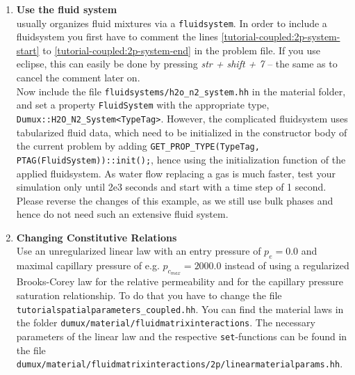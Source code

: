 \begin{enumerate}
\item \textbf{Use the \Dumux fluid system} \\
\Dumux usually organizes fluid mixtures via a \texttt{fluidsystem}. In order to include a fluidsystem you first have to comment the lines \ref{tutorial-coupled:2p-system-start} to \ref{tutorial-coupled:2p-system-end} in the problem file. If you use eclipse, this can easily be done by pressing \textit{str + shift + 7} -- the same as to cancel the comment later on.\\
Now include the file \texttt{fluidsystems/h2o\_n2\_system.hh} in the material folder, and set a property \texttt{FluidSystem} with the appropriate type, \texttt{Dumux::H2O\_N2\_System<TypeTag>}. However, the complicated fluidsystem uses tabularized fluid data, which need to be initialized in the constructor body of the current problem by adding \texttt{GET\_PROP\_TYPE(TypeTag, PTAG(FluidSystem))::init();}, hence using the initialization function of the applied fluidsystem. As water flow replacing a gas is much faster, test your simulation only until 2e3 seconds and start with a time step of 1 second.\\
Please reverse the changes of this example, as we still use bulk phases and hence do not need such an extensive fluid system.

\item \textbf{Changing Constitutive Relations} \\
  Use an unregularized linear law with an entry pressure of $p_e = 0.0$ and maximal capillary pressure of e.g. $p_{c_{max}} = 2000.0$ instead of using a
 regularized Brooks-Corey law for the
  relative permeability and for the capillary pressure saturation relationship. To do that you have
  to change the file \texttt{tutorialspatialparameters\_coupled.hh}. 
 You can find the material laws in the folder 
  \verb+dumux/material/fluidmatrixinteractions+. The necessary parameters
of the linear law and the respective \texttt{set}-functions can be found
 in the file \\
 \verb+dumux/material/fluidmatrixinteractions/2p/linearmaterialparams.hh+.
 

\end{enumerate}
